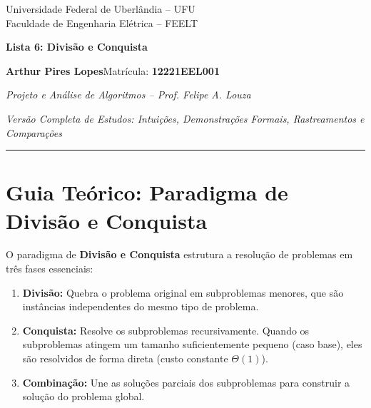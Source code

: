 \documentclass[11pt,a4paper]{article}
\begin{document}
\begin{center}
  {\small Universidade Federal de Uberlândia -- UFU\\Faculdade de Engenharia Elétrica -- FEELT}\par
  \vspace{4pt}
  {\LARGE\bfseries\color{azul} Lista 6: Divisão e Conquista}\par
  \vspace{4pt}
  \textbf{Arthur Pires Lopes}\quad Matrícula: \textbf{12221EEL001}\par
  \textit{Projeto e Análise de Algoritmos -- Prof. Felipe A. Louza}\par
  \vspace{2pt}
  \textit{Versão Completa de Estudos: Intuições, Demonstrações Formais, Rastreamentos e Comparações}
\end{center}
\hrule
\vspace{6pt}

\section*{Guia Teórico: Paradigma de Divisão e Conquista}

O paradigma de \textbf{Divisão e Conquista} estrutura a resolução de problemas em três fases essenciais:
\begin{enumerate}
  \item \textbf{Divisão:} Quebra o problema original em subproblemas menores, que são instâncias independentes do mesmo tipo de problema.
  \item \textbf{Conquista:} Resolve os subproblemas recursivamente. Quando os subproblemas atingem um tamanho suficientemente pequeno (caso base), eles são resolvidos de forma direta (custo constante $\Theta(1)$).
  \item \textbf{Combinação:} Une as soluções parciais dos subproblemas para construir a solução do problema global.
\end{enumerate}
\end{document}
